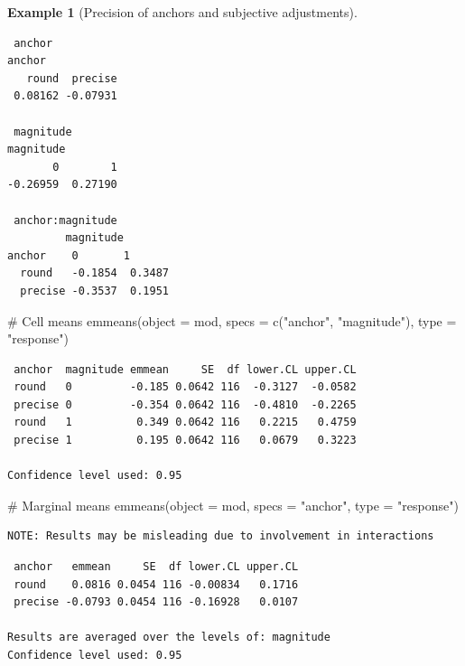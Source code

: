\documentclass[
  11pt,
  letterpaper,
]{scrbook}
\newenvironment{Shaded}{\begin{snugshade}}{\end{snugshade}}
\newcommand{\AttributeTok}[1]{\textcolor[rgb]{0.40,0.45,0.13}{#1}}
\newcommand{\CommentTok}[1]{\textcolor[rgb]{0.37,0.37,0.37}{#1}}
\newcommand{\FunctionTok}[1]{\textcolor[rgb]{0.28,0.35,0.67}{#1}}
\newcommand{\NormalTok}[1]{\textcolor[rgb]{0.00,0.23,0.31}{#1}}
\newcommand{\StringTok}[1]{\textcolor[rgb]{0.13,0.47,0.30}{#1}}
\theoremstyle{definition}
\theoremstyle{definition}
\newtheorem{example}{Example}[chapter]
\theoremstyle{remark}
\begin{document}
\begin{example}[Precision of anchors and subjective
adjustments]
\begin{verbatim}
 anchor 
anchor
   round  precise 
 0.08162 -0.07931 

 magnitude 
magnitude
       0        1 
-0.26959  0.27190 

 anchor:magnitude 
         magnitude
anchor    0       1      
  round   -0.1854  0.3487
  precise -0.3537  0.1951
\end{verbatim}

\begin{Shaded}
\begin{Highlighting}[]
\CommentTok{\# Cell means}
\FunctionTok{emmeans}\NormalTok{(}\AttributeTok{object =}\NormalTok{ mod, }
        \AttributeTok{specs =} \FunctionTok{c}\NormalTok{(}\StringTok{"anchor"}\NormalTok{, }\StringTok{"magnitude"}\NormalTok{),}
        \AttributeTok{type =} \StringTok{"response"}\NormalTok{)}
\end{Highlighting}
\end{Shaded}

\begin{verbatim}
 anchor  magnitude emmean     SE  df lower.CL upper.CL
 round   0         -0.185 0.0642 116  -0.3127  -0.0582
 precise 0         -0.354 0.0642 116  -0.4810  -0.2265
 round   1          0.349 0.0642 116   0.2215   0.4759
 precise 1          0.195 0.0642 116   0.0679   0.3223

Confidence level used: 0.95 
\end{verbatim}

\begin{Shaded}
\begin{Highlighting}[]
\CommentTok{\# Marginal means}
\FunctionTok{emmeans}\NormalTok{(}\AttributeTok{object =}\NormalTok{ mod, }
        \AttributeTok{specs =} \StringTok{"anchor"}\NormalTok{, }
        \AttributeTok{type =} \StringTok{"response"}\NormalTok{)}
\end{Highlighting}
\end{Shaded}

\begin{verbatim}
NOTE: Results may be misleading due to involvement in interactions
\end{verbatim}

\begin{verbatim}
 anchor   emmean     SE  df lower.CL upper.CL
 round    0.0816 0.0454 116 -0.00834   0.1716
 precise -0.0793 0.0454 116 -0.16928   0.0107

Results are averaged over the levels of: magnitude 
Confidence level used: 0.95 
\end{verbatim}


\end{example}
\end{document}
